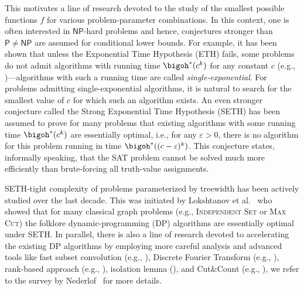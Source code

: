 \documentclass[a4paper,UKenglish,cleveref, autoref, thm-restate]{lipics-v2021}
\begin{document}
This motivates a line of research devoted to the study of the smallest possible functions $f$ for various problem-parameter combinations.
In this context, one is often interested in $\mathsf{NP}$-hard problems and hence, conjectures stronger than $\mathsf{P} \neq \mathsf{NP}$ are assumed for conditional lower bounds. 
For example, it has been shown that unless the Exponential Time Hypothesis (ETH) fails, some problems do not admit algorithms with running time $\bigoh^*(c^k)$ for any constant $c$ (e.g., \cite{doi:10.1137/16M1104834})---algorithms with such a running time are called \emph{single-exponential}.
For problems admitting single-exponential algorithms, it is natural to search for the smallest value of $c$ for which such an algorithm exists.
An even stronger conjecture called the Strong Exponential Time Hypothesis (SETH) has been assumed to prove for many problems that existing algorithms with some running time $\bigoh^*(c^k)$ are essentially optimal, i.e., for any $\varepsilon > 0$, there is no algorithm for this problem running in time $\bigoh^*((c - \varepsilon)^k)$.
This conjecture states, informally speaking, that the \textsc{SAT} problem cannot be solved much more efficiently than brute-forcing all truth-value assignments.

SETH-tight complexity of problems parameterized by treewidth has been actively studied over the last decade. 
This was initiated by Lokshtanov et al.~\cite{DBLP:journals/talg/LokshtanovMS18} who showed that for many classical graph problems (e.g., \textsc{Independent Set} or \textsc{Max Cut}) the folklore dynamic-programming (DP) algorithms are essentially optimal under SETH.
In parallel, there is also a line of research devoted to accelerating the existing DP algorithms by employing more careful analysis and advanced tools like fast subset convolution (e.g., \cite{DBLP:conf/stoc/BjorklundHKK07,DBLP:conf/csr/Rooij21,DBLP:journals/talg/BjorklundHKKNP16}), Discrete Fourier Transform (e.g., \cite{DBLP:conf/birthday/Rooij20}), rank-based approach (e.g., \cite{DBLP:journals/iandc/BodlaenderCKN15}), isolation lemma (\cite{DBLP:journals/combinatorica/MulmuleyVV87}), and Cut\&Count (e.g., \cite{DBLP:journals/corr/abs-1103-0534/CyganNPPRW11}), we refer to the survey by Nederlof~\cite{DBLP:conf/birthday/Nederlof20} for more details.   
 
\end{document}
